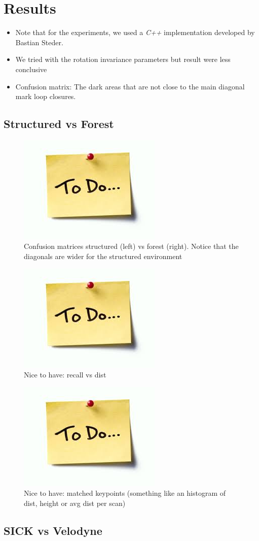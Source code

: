 \section{Results}
\label{sec:chap_slam_results}

\begin{itemize}
    \item Note that for the experiments, we used a \textit{C++} implementation developed by Bastian Steder.
    \item We tried with the rotation invariance parameters but result were less conclusive
    \item Confusion matrix: The dark areas that are not close to the main diagonal mark loop closures.
\end{itemize}

\subsection{Structured vs Forest}
\label{ssec:chap_slam_struct_vs_forest}

\begin{figure}[htpb]
    \centering
    \includegraphics[width=0.2\linewidth]{img/todo.jpg}
    \caption{Confusion matrices structured (left) vs forest (right). Notice that the diagonals are wider for the structured environment}
    \label{fig:matrices_struct_vs_forest}
\end{figure}

\begin{figure}[htpb]
    \centering
    \includegraphics[width=0.2\linewidth]{img/todo.jpg}
    \caption{Nice to have: recall vs dist}
    \label{fig:recall_dist}
\end{figure}

\begin{figure}[htpb]
    \centering
    \includegraphics[width=0.2\linewidth]{img/todo.jpg}
    \caption{Nice to have: matched keypoints (something like an histogram of dist, height or avg dist per scan)}
    \label{fig:match_avg_dist}
\end{figure}

\subsection{SICK vs Velodyne}
\label{ssec:chap_slam_sick_vs_velodyne}
